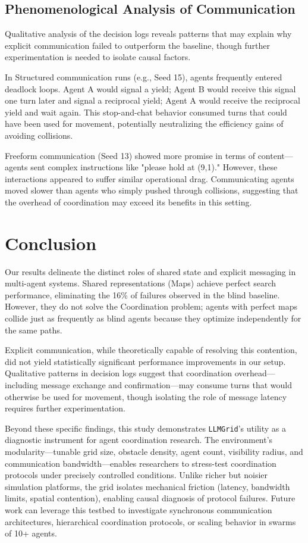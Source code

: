 \documentclass[10pt,twocolumn]{article}
\begin{document}
\subsection{Phenomenological Analysis of Communication}
Qualitative analysis of the decision logs reveals patterns that may explain why explicit communication failed to outperform the baseline, though further experimentation is needed to isolate causal factors.

In Structured communication runs (e.g., Seed 15), agents frequently entered deadlock loops. Agent A would signal a yield; Agent B would receive this signal one turn later and signal a reciprocal yield; Agent A would receive the reciprocal yield and wait again. This stop-and-chat behavior consumed turns that could have been used for movement, potentially neutralizing the efficiency gains of avoiding collisions.

Freeform communication (Seed 13) showed more promise in terms of content—agents sent complex instructions like "please hold at (9,1)." However, these interactions appeared to suffer similar operational drag. Communicating agents moved slower than agents who simply pushed through collisions, suggesting that the overhead of coordination may exceed its benefits in this setting.

\section{Conclusion}

Our results delineate the distinct roles of shared state and explicit messaging in multi-agent systems. Shared representations (Maps) achieve perfect search performance, eliminating the 16\% of failures observed in the blind baseline. However, they do not solve the Coordination problem; agents with perfect maps collide just as frequently as blind agents because they optimize independently for the same paths.

Explicit communication, while theoretically capable of resolving this contention, did not yield statistically significant performance improvements in our setup. Qualitative patterns in decision logs suggest that coordination overhead—including message exchange and confirmation—may consume turns that would otherwise be used for movement, though isolating the role of message latency requires further experimentation.

Beyond these specific findings, this study demonstrates \texttt{LLMGrid}'s utility as a diagnostic instrument for agent coordination research. The environment's modularity—tunable grid size, obstacle density, agent count, visibility radius, and communication bandwidth—enables researchers to stress-test coordination protocols under precisely controlled conditions. Unlike richer but noisier simulation platforms, the grid isolates mechanical friction (latency, bandwidth limits, spatial contention), enabling causal diagnosis of protocol failures. Future work can leverage this testbed to investigate synchronous communication architectures, hierarchical coordination protocols, or scaling behavior in swarms of 10+ agents.



\end{document}
